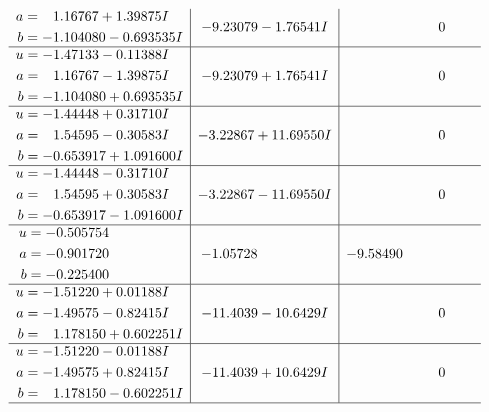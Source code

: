 \documentclass[1p]{elsarticle_modified}
\theoremstyle{definition}
\begin{document}
$$\begin{array}{c|c|c}
\begin{aligned}
a &= \phantom{-}1.16767 + 1.39875 I \\
b &= -1.104080 - 0.693535 I\end{aligned}
 & -9.23079 - 1.76541 I & \phantom{-0.000000 } 0 \\ \hline\begin{aligned}
u &= -1.47133 - 0.11388 I \\
a &= \phantom{-}1.16767 - 1.39875 I \\
b &= -1.104080 + 0.693535 I\end{aligned}
 & -9.23079 + 1.76541 I & \phantom{-0.000000 } 0 \\ \hline\begin{aligned}
u &= -1.44448 + 0.31710 I \\
a &= \phantom{-}1.54595 - 0.30583 I \\
b &= -0.653917 + 1.091600 I\end{aligned}
 & -3.22867 + 11.69550 I & \phantom{-0.000000 } 0 \\ \hline\begin{aligned}
u &= -1.44448 - 0.31710 I \\
a &= \phantom{-}1.54595 + 0.30583 I \\
b &= -0.653917 - 1.091600 I\end{aligned}
 & -3.22867 - 11.69550 I & \phantom{-0.000000 } 0 \\ \hline\begin{aligned}
u &= -0.505754\phantom{ +0.000000I} \\
a &= -0.901720\phantom{ +0.000000I} \\
b &= -0.225400\phantom{ +0.000000I}\end{aligned}
 & -1.05728\phantom{ +0.000000I} & -9.58490\phantom{ +0.000000I} \\ \hline\begin{aligned}
u &= -1.51220 + 0.01188 I \\
a &= -1.49575 - 0.82415 I \\
b &= \phantom{-}1.178150 + 0.602251 I\end{aligned}
 & -11.4039 - 10.6429 I & \phantom{-0.000000 } 0 \\ \hline\begin{aligned}
u &= -1.51220 - 0.01188 I \\
a &= -1.49575 + 0.82415 I \\
b &= \phantom{-}1.178150 - 0.602251 I\end{aligned}
 & -11.4039 + 10.6429 I & \phantom{-0.000000 } 0\\
 \hline 
 \end{array}$$\newpage$$\begin{array}{c|c|c}  

\end{array}$$
\end{document}
